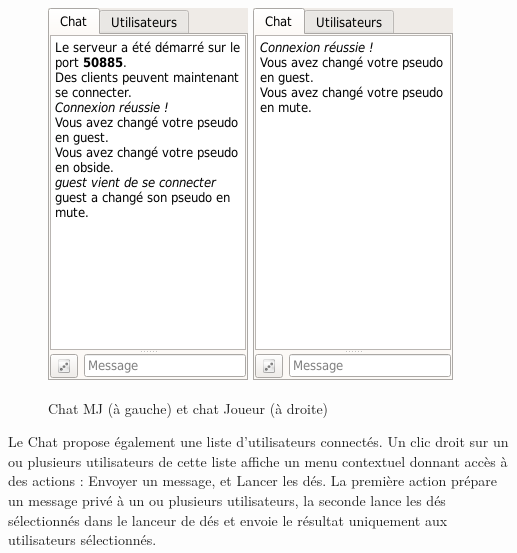 \begin{figure}[h!]
	\centering
	\includegraphics[scale=0.5]{img/chat_mj.png}
	\hspace{10 mm}
	\includegraphics[scale=0.5]{img/chat_player.png}
	\caption{Chat MJ (à gauche) et chat Joueur (à droite)}
\end{figure}

Le Chat propose également une liste d'utilisateurs connectés. Un clic droit sur un ou plusieurs utilisateurs de cette liste affiche un menu contextuel donnant accès à des actions : Envoyer un message, et Lancer les dés.
La première action prépare un message privé à un ou plusieurs utilisateurs, la seconde lance les dés sélectionnés dans le lanceur de dés et envoie le résultat uniquement aux utilisateurs sélectionnés.


